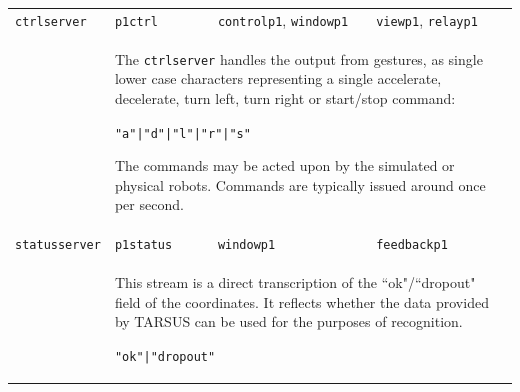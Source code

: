 \documentclass[12pt,a4,notitlepage]{report}
\renewcommand{\_}{\texttt{\symbol{95}}}
\newcommand{\<}{\texttt{\symbol{60}}}
\renewcommand{\>}{\texttt{\symbol{62}}}
\newcommand{\scopendpoint}[1]{\texttt{#1}}
\newcommand{\variable}[1]{\texttt{#1}}
\begin{document}
\begin{tabular}{l|p{2.5cm}p{4.5cm}p{4.5cm}}
\hline
\rule{0mm}{4.5mm}\variable{ctrlserver} & \scopendpoint{p1ctrl} &
\scopendpoint{controlp1}, \scopendpoint{windowp1} &
\scopendpoint{viewp1}, \scopendpoint{relayp1}\rule[-2mm]{0mm}{3mm}\\

 & \multicolumn{3}{l}{\begin{minipage}{12.5cm}%
The \variable{ctrlserver} handles the output from gestures, as single lower case characters representing a single accelerate, decelerate, turn left, turn right or start/stop command:

\texttt{\<"a"|"d"|"l"|"r"|"s"\>}

The commands may be acted upon by the simulated or physical robots. Commands are typically issued around once per second.\rule[-2mm]{0mm}{3mm}
\end{minipage}}\\

\hline
\rule{0mm}{4.5mm}\variable{statusserver} & \scopendpoint{p1status} &
\scopendpoint{windowp1} & \scopendpoint{feedbackp1}\rule[-2mm]{0mm}{3mm}\\

 & \multicolumn{3}{l}{\begin{minipage}{12.5cm}%
This stream is a direct transcription of the ``ok"/``dropout" field of the coordinates. It reflects whether the data provided by TARSUS can be used for the purposes of recognition.

\texttt{\<"ok"|"dropout"\>}
\end{minipage}}\\
\end{tabular}
\end{document}
